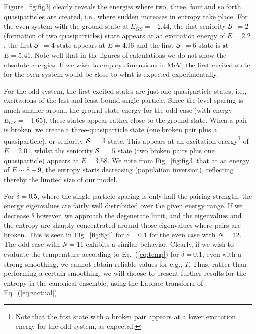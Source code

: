 Figure\ \ref{fig:fig3} clearly reveals the energies where two, three, four and so forth quasiparticles are created, i.e., where sudden increases in entropy take place. For the even system with the ground state at $E_{GS}=-2.44$, the first seniority ${\cal S}$ $=2$ (formation of two quasiparticles) state appears at an excitation energy of $E=2.2$, the first ${\cal S}$ $=4$ state appears at $E=4.06$ and the first ${\cal S}$ $=6$ state is at $E=5.41$. Note well that in the figures of calculations we do not show the absolute energies. If we wish to employ dimensions in MeV, the first excited state for the even system would be close to what is expected experimentally. 

For the odd system, the first excited states are just one-quasiparticle states, i.e.,
excitations of the last and least bound single-particle. Since the level spacing is much smaller around the ground state energy for the odd case (with energy $E_{GS}=-1.65$), these states appear rather close to the ground state. When a pair is broken, we create a three-quasiparticle state (one broken pair plus a quasiparticle), or seniority ${\cal S}$ $=3$ state. This appears at an excitation energy\footnote{Note that the first state with a broken pair appears at a lower excitation energy for the odd system, as expected.} of $E=2.01$, whilst the seniority ${\cal S}$ $=5$ state (two broken pairs plus one quasiparticle) appears at $E=3.58$. We note from Fig.\ \ref{fig:fig3} that at an energy of $E\sim 8-9$, the entropy starts decreasing (population inversion), reflecting thereby the limited size of our model.

For $\delta=0.5$, where the single-particle spacing is only half the pairing strength, the energy eigenvalues are fairly well distributed over the given energy range. If we decrease $\delta$ however, we approach the degenerate limit, and the eigenvalues and the entropy are sharply concentrated around those eigenvalues where pairs are broken. This is seen in Fig.\ \ref{fig:fig4} for $\delta=0.1$ for the even case with $N=12$. The odd case with $N=11$ exhibits a similar behavior. Clearly, if we wish to evaluate the temperature according to Eq.\ (\ref{eq:temp}) for $\delta=0.1$, even with a strong smoothing, we cannot obtain reliable values for e.g., $T$. Thus, rather than performing a certain smoothing, we will choose to present further results for the entropy in the canonical ensemble, using the Laplace transform of Eq.\ (\ref{eq:zactual}). 

